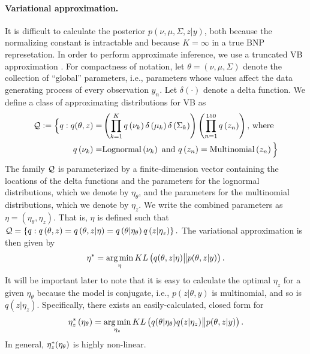 %
\paragraph{Variational approximation.}
It is difficult to calculate the posterior $p\left(\nu, \mu, \Sigma, z \vert
y\right)$, both because the normalizing constant is intractable and because
$K=\infty$ in a true BNP represetation. In order to perform approximate
inference, we use a truncated VB approximation
\citep{blei:2006:dirichletbnp}. For compactness of notation, let $\theta =
\left(\nu, \mu, \Sigma\right)$ denote the collection of ``global'' parameters,
i.e., parameters whose values affect the data generating process of every
observation $y_n$.   Let $\delta\left(\cdot\right)$ denote a delta function. We
define a class of approximating distributions for VB as
%
\begin{align*}
\mathcal{Q} := \Big\{ q:
q(\theta, z) = &
\left(\prod_{k=1}^{K}q\left(\nu_{k}\right)\delta\left(\mu_{k}\right)
    \delta\left(\Sigma_{k}\right)\right)
    \left(\prod_{n=1}^{150}q\left(z_{n}\right) \right)\textrm{, where } \\
q\left(\nu_{k}\right) =& \mathrm{Lognormal}\left(\nu_k\right) \textrm{ and }
q\left(z_n\right) = \mathrm{Multinomial}\left(z_n\right)
\Big\}
\end{align*}
%
The family $\mathcal{Q}$ is parameterized by a finite-dimension vector containing
the locations of the delta functions and the parameters for the lognormal
distributions, which we denote by $\eta_\theta$, and the parameters for the
multinomial distributions, which we denote by $\eta_z$.
We write the combined parameters as $\eta=\left(\eta_\theta, \eta_z\right)$.
That is, $\eta$ is defined such that
%
$\mathcal{Q} =
    \left\{q: q\left(\theta, z\right) =
            q\left(\theta, z \vert \eta \right) =
            q\left(\theta \vert \eta_\theta \right)
            q\left(z \vert \eta_z \right)
    \right\}.$
%
The variational approximation is then given by
%
\begin{align}
\eta^{*} = \operatorname*{arg\,min}_{\eta} KL\left(
    q(\theta, z \vert \eta) \big\| p(\theta, z | y)
    \right). \label{eq:kl_objective}
\end{align}
%
It will be important later to note that it is easy to calculate
the optimal $\eta_z$ for a given $\eta_\theta$ because the model is
conjugate, i.e., $p\left(z \vert \theta, y\right)$ is multinomial,
and so is $q\left(z \vert \eta_z\right)$.  Specifically, there
exists an easily-calculated, closed form for
%
\begin{align}
\eta_z^{*}\left(\eta_\theta\right) = \operatorname*{arg\,min}_{\eta_z}
    KL\left(
    q(\theta \vert \eta_\theta) q( z \vert \eta_z)
        \big\| p(\theta, z | y)
    \right).
\label{eq:z_update}
\end{align}
%
In general, $\eta_z^{*}(\eta_\theta)$ is highly non-linear.
%

